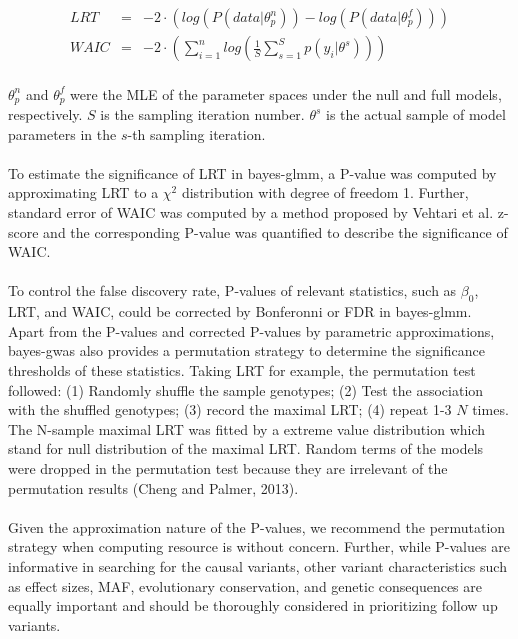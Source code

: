 \documentclass[12pt]{article}
\begin{document}
\begin{eqnarray}
LRT & = & -2 \cdot (log(P(data | \theta^n_p)) - log(P(data | \theta^f_p))) \\
WAIC & = &  -2 \cdot (\sum_{i=1}^{n} log(\frac{1}{S} \sum_{s = 1}^{S} p(y_i | \theta^s)))
\end{eqnarray}

\paragraph{}{
$\theta^n_p$ and $\theta^f_p$ were the MLE of the parameter spaces under the null and full models, respectively. $S$ is the sampling iteration number. $\theta^s$ is the actual sample of model parameters in the $s$-th sampling iteration. 
}

\paragraph{}{
To estimate the significance of LRT in bayes-glmm, a P-value was computed by approximating LRT to a $\chi^2$ distribution with degree of freedom 1. Further, standard error of WAIC was computed by a method proposed by Vehtari et al. z-score and the corresponding P-value was quantified to describe the significance of WAIC. 
}

\paragraph{}{
To control the false discovery rate, P-values of relevant statistics, such as $\beta_0$, LRT, and WAIC, could be corrected by Bonferonni or FDR in bayes-glmm. Apart from the P-values and corrected P-values by parametric approximations, bayes-gwas also provides a permutation strategy to determine the significance thresholds of these statistics. Taking LRT for example, the permutation test followed: (1) Randomly shuffle the sample genotypes; (2) Test the association with the shuffled genotypes; (3) record the maximal LRT; (4) repeat 1-3 $N$ times. The N-sample maximal LRT was fitted by a extreme value distribution which stand for null distribution of the maximal LRT. Random terms of the models were dropped in the permutation test because they are irrelevant of the permutation results (Cheng and Palmer, 2013). 
}

\paragraph{}{Given the approximation nature of the P-values, we recommend the permutation strategy when computing resource is without concern. Further, while P-values are informative in searching for the causal variants, other variant characteristics such as effect sizes, MAF, evolutionary conservation, and genetic consequences are equally important and should be thoroughly considered in prioritizing follow up variants. 
}
\end{document}
